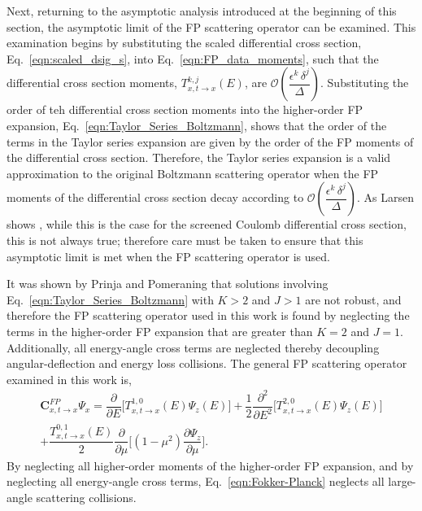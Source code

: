 Next, returning to the asymptotic analysis introduced at the beginning of this section, the asymptotic limit of the FP scattering operator can be examined. This examination begins by substituting the scaled differential cross section, Eq.~\eqref{eqn:scaled_dsig_s}, into Eq.~\eqref{eqn:FP_data_moments}, such that the differential cross section moments, $T_{x,t\rightarrow x}^{k,j}(E)$, are $\mathcal{O}\left(\dfrac{\epsilon^k \, \delta^j}{\Delta}\right)$. Substituting the order of teh differential cross section moments into the higher-order FP expansion, Eq.~\eqref{eqn:Taylor_Series_Boltzmann}, shows that the order of the terms in the Taylor series expansion are given by the order of the FP moments of the differential cross section. Therefore, the Taylor series expansion is a valid approximation to the original Boltzmann scattering operator when the FP moments of the differential cross section decay according to $\mathcal{O}\left(\dfrac{\epsilon^k \, \delta^j}{\Delta}\right)$. As Larsen shows \cite{Larsen-1999}, while this is the case for the screened Coulomb differential cross section, this is not always true; therefore care must be taken to ensure that this asymptotic limit is met when the FP scattering operator is used.

It was shown by Prinja and Pomeraning \cite{Prinja-2001} that solutions involving Eq.~\eqref{eqn:Taylor_Series_Boltzmann} with $K>2$ and $J>1$ are not robust, and therefore the FP scattering operator used in this work is found by neglecting the terms in the higher-order FP expansion that are greater than $K=2$ and $J=1$. Additionally, all energy-angle cross terms are neglected thereby decoupling angular-deflection and energy loss collisions. The general FP scattering operator examined in this work is,
\begin{multline} \label{eqn:Fokker-Planck}
    \boldsymbol{C}_{x,t \rightarrow x}^{FP} \Psi_x = \dfrac{\partial}{\partial E} \Big[ T_{x,t \rightarrow x}^{1,0}(E) \Psi_z(E) \Big] + \dfrac{1}{2} \dfrac{\partial^2}{\partial E^2} \Big[ T_{x,t \rightarrow x}^{2,0}(E) \Psi_z(E) \Big] \\
    + \dfrac{T_{x,t \rightarrow x}^{0,1}(E)}{2} \dfrac{\partial}{\partial \mu} \Big[(1-\mu^2) \dfrac{\partial \Psi_z}{\partial \mu}\Big].
\end{multline}
By neglecting all higher-order moments of the higher-order FP expansion, and by neglecting all energy-angle cross terms, Eq.~\eqref{eqn:Fokker-Planck} neglects all large-angle scattering collisions.

